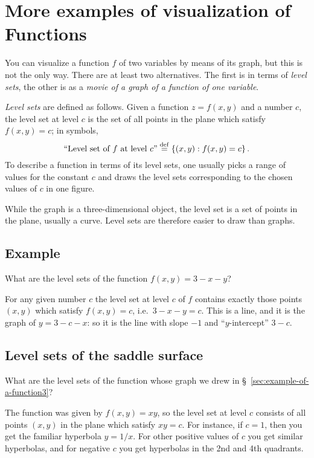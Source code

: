 \section{More examples of visualization of Functions}    %

You can visualize a function $f$ of two variables by means of its
graph, but this is not the only way.  There are at least two
alternatives.  The first is in terms of \emph{level sets}, the other
is as a \emph{movie of a graph of a function of one variable}.

\emph{Level sets} are defined as follows.  Given a function $z=f(x,
y)$ and a number $c$, the level set at level $c$ is the set of all
points in the plane which satisfy $f(x, y) = c$; in symbols,
\[
\text{``Level set of $f$ at level $c$''} 
\stackrel{\rm def}{=}
\left\{ (x, y) : f(x, y) = c \right\}.
\]
To describe a function in terms of its level sets, one usually picks a
range of values for the constant $c$ and draws the level sets
corresponding to the chosen values of $c$ in one figure.

While the graph is a three-dimensional object, the level set is a set
of points in the plane, usually a curve.  Level sets are therefore
easier to draw than graphs.  

\subsection{Example}\label{sec:01levelsetexample}    %
What are the level sets of the function $f(x, y) = 3-x-y$?

For any given number $c$ the level set at level $c$ of $f$ contains
exactly those points $(x, y)$ which satisfy $f(x, y) = c$, i.e.\
$3-x-y = c$.  This is a line, and it is the graph of $y= 3-c-x$:  so
it is the line with slope $-1$ and ``$y$-intercept'' $3-c$.


\subsection{Level sets of the saddle surface}  What are the level sets    %
of the function whose graph we drew in \S~\ref{sec:example-of-a-function3}?

The function was given by $f(x, y)= xy$, so the level set at level
$c$ consists of all points $(x, y)$ in the plane which satisfy
$xy=c$.  For instance, if $c=1$, then you get the familiar hyperbola
$y=1/x$.  For other positive values of $c$ you get similar hyperbolas,
and for negative $c$ you get hyperbolas in the 2nd and 4th quadrants.

